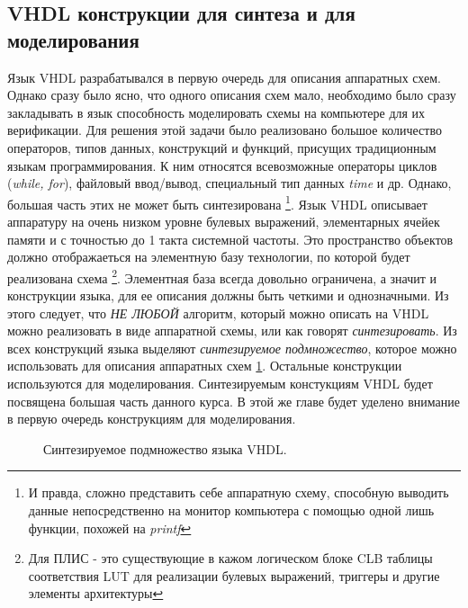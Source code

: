 \subsection{VHDL конструкции для синтеза и для моделирования}


Язык VHDL разрабатывался в первую очередь для описания аппаратных схем. Однако сразу было ясно, что одного описания схем мало, необходимо было сразу закладывать в язык способность моделировать схемы на компьютере для их верификации. Для решения этой задачи было реализовано большое количество операторов, типов данных, конструкций и функций, присущих традиционным языкам программирования. К ним относятся всевозможные операторы циклов (\emph{while, for}), файловый ввод/вывод, специальный тип данных \emph{time} и др. Однако, большая часть этих не может быть синтезирована \footnote{И правда, сложно представить себе аппаратную схему, способную выводить данные непосредственно на монитор компьютера с помощью одной лишь функции, похожей на \emph{printf}}. Язык VHDL описывает аппаратуру на очень низком уровне булевых выражений, элементарных ячейек памяти и с точностью до 1 такта системной частоты. Это пространство объектов должно отображаеться на элементную базу технологии, по которой будет реализована схема \footnote{Для ПЛИС - это существующие в кажом логическом блоке CLB таблицы соответствия LUT для реализации булевых выражений, триггеры и другие элементы архитектуры}. Элементная база всегда довольно ограничена, а значит и конструкции языка, для ее описания должны быть четкими и однозначными. Из этого следует, что \emph{НЕ ЛЮБОЙ} алгоритм, который можно описать на VHDL можно реализовать в виде аппаратной схемы, или как говорят \emph{синтезировать}. Из всех конструкций языка выделяют \emph{синтезируемое подмножество}, которое можно использовать для описания аппаратных схем \ref{vhdl_set_1}. Остальные конструкции используются для моделирования. Синтезируемым констукциям VHDL будет посвящена большая часть данного курса. В этой же главе будет уделено внимание в первую очередь конструкциям для моделирования.  

\begin{figure}[ht]
\centering
{}
\caption{Синтезируемое подмножество языка VHDL.}
\label{vhdl_set_1}
\end{figure}

